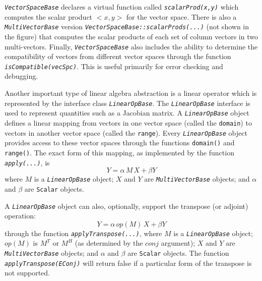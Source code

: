 \documentclass[pdf,ps2pdf,11pt]{SANDreport}
\begin{document}
{}\texttt{\textit{Vector\-Space\-Base}} declares a virtual function called
{}\texttt{\textit{scalarProd(x,y)}} which computes the scalar product $<x,y>$
for the vector space.  There is also a {}\texttt{\textit{Multi\-Vector\-Base}}
version {}\texttt{\textit{Vector\-Space\-Base\-::scalarProds(...)}}  (not
shown in the figure) that computes the scalar products of each set of column
vectors in two multi-vectors.  Finally,
{}\texttt{\textit{Vector\-Space\-Base}} also includes the ability to determine
the compatibility of vectors from different vector spaces through the function
{}\texttt{\textit{isCompatible(vecSpc)}}.  This is useful primarily for error
checking and debugging.

Another important type of linear algebra abstraction is a linear operator
which is represented by the interface class
{}\texttt{\textit{Linear\-Op\-Base}}.  The
{}\texttt{\textit{Linear\-Op\-Base}} interface is used to represent quantities
such as a Jacobian matrix. A {}\texttt{\textit{Linear\-Op\-Base}} object
defines a linear mapping from vectors in one vector space (called the
{}\texttt{domain}) to vectors in another vector space (called the
{}\texttt{range}).  Every {}\texttt{\textit{Linear\-Op\-Base}} object provides
access to these vector spaces through the functions {}\texttt{domain()} and
{}\texttt{range()}.  The exact form of this mapping, as implemented by the
function {}\texttt{\textit{apply(\-...)}}, is
%
\begin{equation}
Y = \alpha \, M \, X + \beta Y
\label{thyra:equ:apply_vec}
\end{equation}
%
where $M$ is a {}\texttt{\textit{Linear\-Op\-Base}} object; $X$ and $Y$ are
{}\texttt{\textit{Multi\-Vector\-Base}} objects; and $\alpha$ and $\beta$ are
{}\texttt{Scalar} objects.

A {}\texttt{\textit{Linear\-Op\-Base}} object can also, optionally, support
the transpose (or adjoint) operation:
%
\begin{equation}
Y = \alpha \, op(M) \, X + \beta Y
\label{thyra:equ:apply_transpose_vec}
\end{equation}
%
through the function {}\texttt{\textit{apply\-Transpose(\-...)}}, where $M$ is
a {}\texttt{\textit{Linear\-Op\-Base}} object; $op(M)$ is $M^T$ or $M^H$ (as
determined by the $conj$ argument); $X$ and $Y$ are
{}\texttt{\textit{Multi\-Vector\-Base}} objects; and $\alpha$ and $\beta$ are
{}\texttt{Scalar} objects.  The function
{}\texttt{\textit{applyTranspose(EConj)}} will return false if a particular
form of the transpose is not supported.
\end{document}
